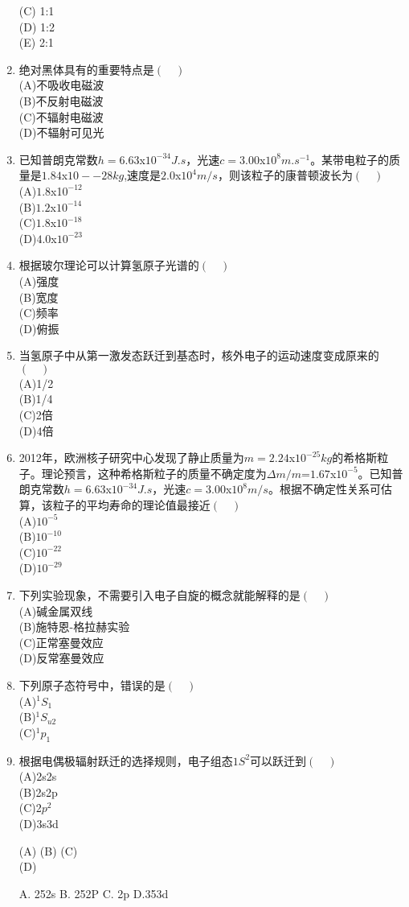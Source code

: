 \begin{enumerate}
(C) 1:1\\
(D) 1:2\\
(E) 2:1
\item 绝对黑体具有的重要特点是$(\quad)$\\
(A)不吸收电磁波\\
(B)不反射电磁波\\
(C)不辐射电磁波\\
(D)不辐射可见光
\item 已知普朗克常数$h=6.63$x$10^{-34}J.s$，光速$c=3.00$x$10^8m.s^{-1}$。某带电粒子的质量是$1.84$x$10-{-28}kg$,速度是$2.0$x$10^4 m/s$，则该粒子的康普顿波长为$(\quad)$\\
(A)$1.8$x1$0^{-12}$\\
(B)$1.2$x$10^{-14}$\\
(C)$1.8$x$10^{-18}$\\
(D)$4.0$x$10^{-23}$
\item 根据玻尔理论可以计算氢原子光谱的$(\quad)$\\
(A)强度\\
(B)宽度\\
(C)频率\\
(D)俯振
\item 当氢原子中从第一激发态跃迁到基态时，核外电子的运动速度变成原来的$(\quad)$\\
(A)1/2\\
(B)1/4\\
(C)2倍\\
(D)4倍
\item 2012年，欧洲核子研究中心发现了静止质量为$m=2.24$x$10^{-25}kg$的希格斯粒子。理论预言，这种希格斯粒子的质量不确定度为$\Delta m/m$=$1.67$x$10^{-5}$。已知普朗克常数$h=6.63$x$10^{-34}J.s$，光速$c=3.00$x$10^8 m/s$。根据不确定性关系可估算，该粒子的平均寿命的理论值最接近$(\quad)$\\
(A)$10^{-5}$\\
(B)$10^{-10}$\\
(C)$10^{-22}$\\
(D)$10^{-29}$
\item 下列实验现象，不需要引入电子自旋的概念就能解释的是$(\quad)$\\
(A)碱金属双线 \\
(B)施特恩-格拉赫实验\\
(C)正常塞曼效应\\
(D)反常塞曼效应
\item 下列原子态符号中，错误的是$(\quad)$\\
(A)$^1S_1$\\
(B)$^1S_{u2}$\\
(C)$^1p_1$\\
\item 根据电偶极辐射跃迁的选择规则，电子组态$1S^2$可以跃迁到$(\quad)$\\
(A)2s2s\\
(B)2s2p\\
(C)2$p^2$\\
(D)3s3d


(A)
(B)
(C)\\
(D)

A. 252s
B. 252P
C. 2p
D.353d
\end{enumerate}